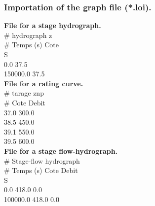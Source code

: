 \documentclass[a4paper,12pt]{article}
\begin{document}
\subsubsection{Importation of the graph file (*.loi).}
\vspace{0.5cm}
\textbf{File for a stage hydrograph.}\\
\vspace{0.5cm}
\# hydrograph z\\
\# Temps (s) Cote\\
         S\\
 0.0 37.5\\
 150000.0 37.5\\
\vspace{0.5cm}
\textbf{File for a rating curve.}\\
\vspace{0.5cm}
  \# tarage znp\\
\# Cote Debit\\
 37.0 300.0\\
 38.5 450.0\\
 39.1 550.0\\
 39.5 600.0\\
\vspace{0.5cm}
\textbf{File for a stage flow-hydrograph.}\\
\vspace{0.5cm}
\# Stage-flow hydrograph\\
\# Temps (s) Cote Debit\\
         S\\
 0.0 418.0 0.0\\
 100000.0 418.0 0.0\\

\vspace{0.5cm}
\end{document}
